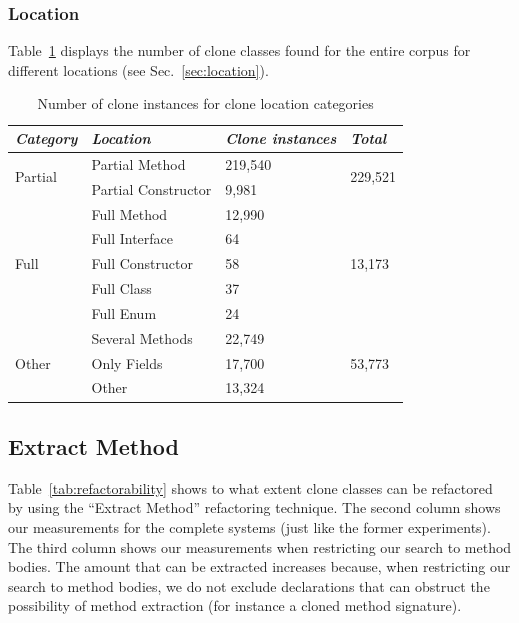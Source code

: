 \documentclass[sigconf,review, table]{acmart}
\begin{document}
\subsubsection{Location}
Table~\ref{tab:location} displays the number of clone classes found for the entire corpus for different locations (see Sec.~\ref{sec:location}).

\begin{table}[H]
\centering
\begin{tabular}{@{}llll@{}}
\toprule
\textit{\textbf{Category}} & \textit{\textbf{Location}} & \textit{\textbf{Clone instances}} & \textit{\textbf{Total}} \\ \midrule
\multirow{2}{*}{Partial} & Partial Method & 219,540 & \multirow{2}{*}{229,521} \\ \cmidrule(lr){2-3}
 & Partial Constructor & 9,981 &  \\ \midrule
\multirow{5}{*}{Full} & Full Method & 12,990 & \multirow{5}{*}{13,173} \\ \cmidrule(lr){2-3}
 & Full Interface & 64 &  \\ \cmidrule(lr){2-3}
 & Full Constructor & 58 &  \\ \cmidrule(lr){2-3}
 & Full Class & 37 &  \\ \cmidrule(lr){2-3}
 & Full Enum & 24 &  \\ \midrule
\multirow{3}{*}{Other} & Several Methods & 22,749 & \multirow{3}{*}{53,773} \\ \cmidrule(lr){2-3}
 & Only Fields & 17,700 &  \\ \cmidrule(lr){2-3}
 & Other & 13,324 &  \\ \bottomrule
\end{tabular}
\caption{Number of clone instances for clone location categories}
\label{tab:location}
\end{table}

\subsection{Extract Method}
Table~\ref{tab:refactorability} shows to what extent clone classes can be refactored by using the ``Extract Method'' refactoring technique. The second column shows our measurements for the complete systems (just like the former experiments). The third column shows our measurements when restricting our search to method bodies. The amount that can be extracted increases because, when restricting our search to method bodies, we do not exclude declarations that can obstruct the possibility of method extraction (for instance a cloned method signature).
\end{document}
